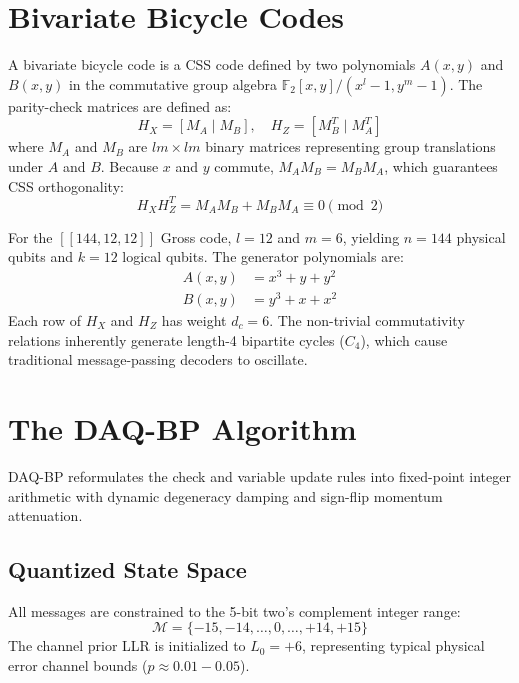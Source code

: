\documentclass[aps,prxquantum,reprint,twocolumn,superscriptaddress,nofootinbib]{revtex4-2}
\begin{document}
\section{Bivariate Bicycle Codes}
A bivariate bicycle code is a CSS code defined by two polynomials $A(x, y)$ and $B(x, y)$ in the commutative group algebra $\mathbb{F}_2[x, y] / (x^l - 1, y^m - 1)$. The parity-check matrices are defined as:
\begin{equation}
    H_X = [M_A \mid M_B], \quad H_Z = [M_B^T \mid M_A^T]
\end{equation}
where $M_A$ and $M_B$ are $lm \times lm$ binary matrices representing group translations under $A$ and $B$. Because $x$ and $y$ commute, $M_A M_B = M_B M_A$, which guarantees CSS orthogonality:
\begin{equation}
    H_X H_Z^T = M_A M_B + M_B M_A \equiv 0 \pmod 2
\end{equation}

For the $[[144, 12, 12]]$ Gross code, $l=12$ and $m=6$, yielding $n=144$ physical qubits and $k=12$ logical qubits. The generator polynomials are:
\begin{align}
    A(x, y) &= x^3 + y + y^2 \\
    B(x, y) &= y^3 + x + x^2
\end{align}
Each row of $H_X$ and $H_Z$ has weight $d_c = 6$. The non-trivial commutativity relations inherently generate length-4 bipartite cycles ($C_4$), which cause traditional message-passing decoders to oscillate.

\section{The DAQ-BP Algorithm}
DAQ-BP reformulates the check and variable update rules into fixed-point integer arithmetic with dynamic degeneracy damping and sign-flip momentum attenuation.

\subsection{Quantized State Space}
All messages are constrained to the 5-bit two's complement integer range:
\begin{equation}
    \mathcal{M} = \{ -15, -14, \dots, 0, \dots, +14, +15 \}
\end{equation}
The channel prior LLR is initialized to $L_0 = +6$, representing typical physical error channel bounds ($p \approx 0.01 - 0.05$).
\end{document}

